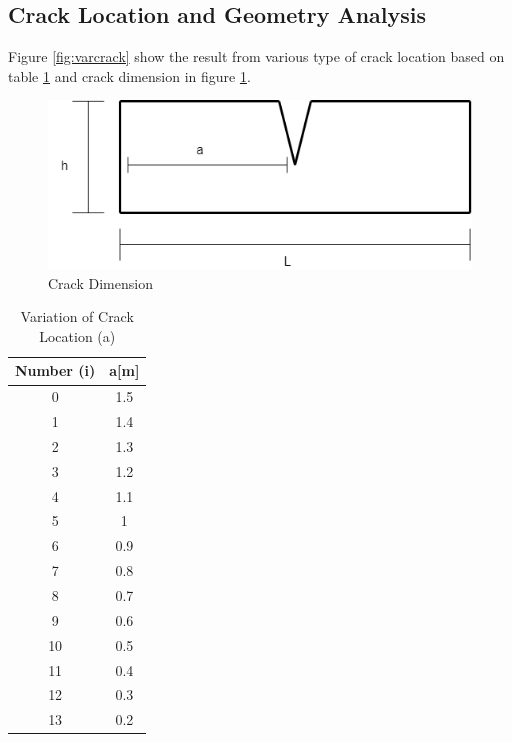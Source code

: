 \documentclass[a4paper,11pt]{article}
\begin{document}
\subsection{Crack Location and Geometry Analysis}
Figure \ref{fig:varcrack} show the result from various type of crack location based on table \ref{tab:avarloc} and crack dimension in figure \ref{fig:dimcrack}.
\begin{figure}[h!]
		\centering
		\includegraphics[width=0.5\linewidth]{picture/conference/CrackDimension}
		\caption{Crack Dimension}
		\label{fig:dimcrack}
\end{figure}
\begin{table}[h!]
	\centering
	\begin{tabular}{|c|c|}
		\hline
		Number (i)	&	a[m]	\\
		\hline
0	&	1.5	\\
1	&	1.4	\\
2	&	1.3	\\
3	&	1.2	\\
4	&	1.1	\\
5	&	1	\\
6	&	0.9	\\
7	&	0.8	\\
8	&	0.7	\\
9	&	0.6	\\
10	&	0.5	\\
11	&	0.4	\\
12	&	0.3	\\
13	&	0.2	\\
		\hline
	\end{tabular}
	\caption{Variation of Crack Location (a)}
	\label{tab:avarloc}
\end{table}
\end{document}
